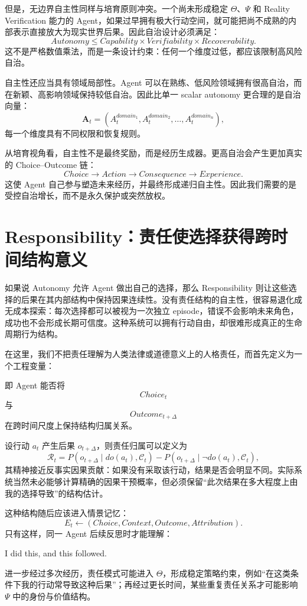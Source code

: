 但是，无边界自主性同样与培育原则冲突。一个尚未形成稳定 $\Theta$、$\Psi$ 和 Reality Verification 能力的 Agent，如果过早拥有极大行动空间，就可能把尚不成熟的内部表示直接放大为现实世界后果。因此自治设计必须满足：
\[
\boxed{
Autonomy
\leq
Capability
\times
Verifiability
\times
Recoverability.
}
\]
这不是严格数值乘法，而是一条设计约束：任何一个维度过低，都应该限制高风险自治。

自主性还应当具有领域局部性。Agent 可以在熟练、低风险领域拥有很高自治，而在新颖、高影响领域保持较低自治。因此比单一 scalar autonomy 更合理的是自治向量：
\[
\mathbf A_t=
(A_t^{domain_1},A_t^{domain_2},\ldots,A_t^{domain_n}),
\]
每一个维度具有不同权限和恢复规则。

从培育视角看，自主性不是最终奖励，而是经历生成器。更高自治会产生更加真实的 Choice--Outcome 链：
\[
Choice
\rightarrow
Action
\rightarrow
Consequence
\rightarrow
Experience.
\]
这使 Agent 自己参与塑造未来经历，并最终形成递归自主性。因此我们需要的是受控自治增长，而不是永久保护或突然放权。

\section{Responsibility：责任使选择获得跨时间结构意义}

如果说 Autonomy 允许 Agent 做出自己的选择，那么 Responsibility 则让这些选择的后果在其内部结构中保持因果连续性。没有责任结构的自主性，很容易退化成无成本探索：每次选择都可以被视为一次独立 episode，错误不会影响未来角色，成功也不会形成长期可信度。这种系统可以拥有行动自由，却很难形成真正的生命周期行为结构。

在这里，我们不把责任理解为人类法律或道德意义上的人格责任，而首先定义为一个工程变量：
\begin{statementbox}
\centering
{}
\end{statementbox}
即 Agent 能否将
\[
Choice_t
\]
与
\[
Outcome_{t+\Delta}
\]
在跨时间尺度上保持结构归属关系。

设行动 $a_t$ 产生后果 $o_{t+\Delta}$，则责任归属可以定义为
\[
\mathcal R_t
=
P
\left(
o_{t+\Delta}
\mid
do(a_t),
\mathcal C_t
\right)
-
P
\left(
o_{t+\Delta}
\mid
\neg do(a_t),
\mathcal C_t
\right),
\]
其精神接近反事实因果贡献：如果没有采取该行动，结果是否会明显不同。实际系统当然未必能够计算精确的因果干预概率，但必须保留“此次结果在多大程度上由我的选择导致”的结构估计。

这种结构随后应该进入情景记忆：
\[
E_t
\leftarrow
(
Choice,
Context,
Outcome,
Attribution
).
\]
只有这样，同一 Agent 后续反思时才能理解：
\begin{statementbox}
I did this, and this followed.
\end{statementbox}
进一步经过多次经历，责任模式可能进入 $\Theta$，形成稳定策略约束，例如“在这类条件下我的行动常导致这种后果”；再经过更长时间，某些重复责任关系才可能影响 $\Psi$ 中的身份与价值结构。

